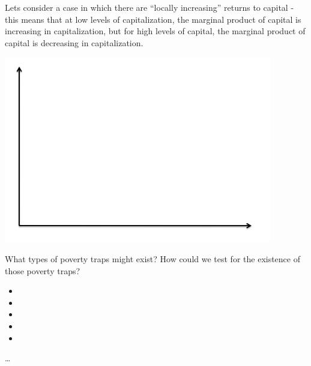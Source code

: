 \documentclass[12pt,english]{article}
\begin{document}
Lets consider a case in which there are ``locally increasing'' returns to capital - this means that at low levels of capitalization, the marginal product of capital is increasing in capitalization, but for high levels of capital, the marginal product of capital is decreasing in capitalization.
\begin{center}
	\begin{adjustbox}{
			max width=\textwidth,
		}
		\includegraphics{axes.png}
	\end{adjustbox}
\end{center}
What types of poverty traps might exist? How could we test for the existence of those poverty traps?
\begin{itemize}
	\item 
	\item
	\item
	\item
	\item
\end{itemize}

\ldots
\end{document}
